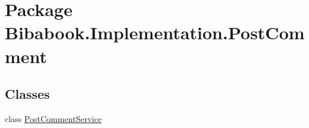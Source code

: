 \hypertarget{namespace_bibabook_1_1_implementation_1_1_post_comment}{}\section{Package Bibabook.\+Implementation.\+Post\+Comment}
\label{namespace_bibabook_1_1_implementation_1_1_post_comment}
\subsection*{Classes}
\begin{DoxyCompactItemize}
\item 
class \hyperlink{class_bibabook_1_1_implementation_1_1_post_comment_1_1_post_comment_service}{Post\+Comment\+Service}
\end{DoxyCompactItemize}
